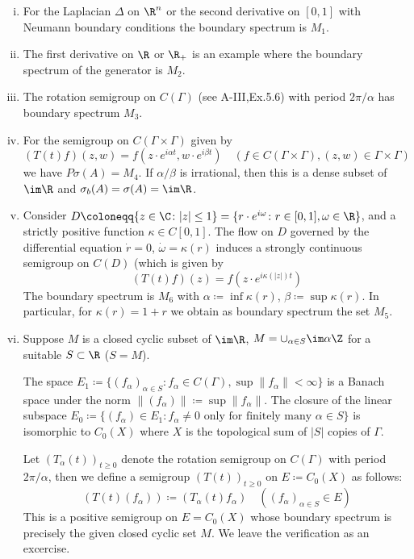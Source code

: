 \begin{examples}\label{ex:b3-2.6}
\begin{enumerate}[(i)]
\item
For the Laplacian $\Delta$ on $\R^{n}$ or the second derivative on $[0,1]$ with Neumann boundary conditions the boundary spectrum is $M_{1}$.
	
\item
The first derivative on $\R$ or $\R_{+}$ is an example where the boundary spectrum of the generator is $M_{2}$.
	
\item
The rotation semigroup on $C(\Gamma)$ (see A-III,Ex.5.6) with period $2\pi/\alpha$ has boundary spectrum $M_{3}$.
%
%
%			
%			
	
\item
For the semigroup on $C(\Gamma \times \Gamma)$ given by
	\[
	(T(t)f)(z,w) = f(z\cdot e^{i\alpha t},w\cdot e^{i\beta t}) \quad (f \in C(\Gamma \times \Gamma), (z,w) \in \Gamma \times \Gamma)
	\]
	we have $P\sigma(A) = M_{4}$.
	If $\alpha/\beta$ is irrational, then this is a dense subset of $\im \R$ and $\sigma_{b}(A) = \sigma(A) = \im\R$.
	
\item
Consider $D \coloneqq \{z \in \C \colon |z| \leq 1\} = \{r\cdot e^{i\omega} \colon r \in [0,1], \omega \in \R\}$, and a strictly positive function $\kappa \in C[0,1]$.
	The flow on $D$ governed by the differential equation $\dot{r} = 0$, $\dot{\omega} = \kappa(r)$ induces a strongly continuous semigroup on $C(D)$ (which is given by
	\[
	(T(t)f)(z) = f(z\cdot e^{i\kappa(|z|)t})
	\]
	The boundary spectrum is $M_{6}$ with $\alpha \coloneqq \inf \kappa(r)$, $\beta \coloneqq \sup \kappa(r)$.
	In particular, for $\kappa(r) = 1 + r$ we obtain as boundary spectrum the set $M_{5}$.
	
\item
Suppose $M$ is a closed cyclic subset of $\im \R$, $M = \cup_{\alpha \in S} \im\alpha\Z$ for a suitable $S \subset \R$ (\eg $S = M$).
	
	The space $E_{1} \coloneqq \{(f_{\alpha})_{\alpha \in S} \colon f_{\alpha} \in C(\Gamma), \sup \|f_{\alpha}\| < \infty\}$ is a Banach space under the norm $\|(f_{\alpha})\| \coloneqq \sup \|f_{\alpha}\|$.
	The closure of the linear subspace $E_{0} \coloneqq \{(f_{\alpha}) \in E_{1} \colon f_{\alpha} \neq 0 \text{ only for finitely many } \alpha \in S\}$ is isomorphic to $C_{0}(X)$ where $X$ is the topological sum of $|S|$ copies of $\Gamma$.
	
	Let $(T_{\alpha}(t))_{t \geq 0}$ denote the rotation semigroup on $C(\Gamma)$ with period $2\pi/\alpha$, then we define a semigroup $(T(t))_{t \geq 0}$ on $E \coloneqq C_{0}(X)$ as follows:
	\[
	(T(t)(f_{\alpha})) \coloneqq (T_{\alpha}(t)f_{\alpha}) \quad ((f_{\alpha})_{\alpha \in S} \in E)
	\]
	This is a positive semigroup on $E = C_{0}(X)$ whose boundary spectrum is precisely the given closed cyclic set $M$.
	We leave the verification as an excercise.
	
\end{enumerate}
\end{examples}
